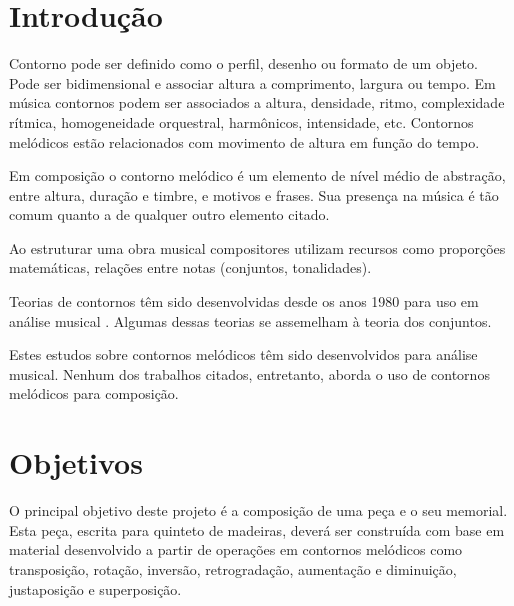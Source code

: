 \documentclass{article}
\begin{document}

\section{Introdução}
\label{sec:introducao}

Contorno pode ser definido como o perfil, desenho ou formato de um
objeto. Pode ser bidimensional e associar altura a comprimento,
largura ou tempo. Em música contornos podem ser associados a altura,
densidade, ritmo, complexidade rítmica, homogeneidade orquestral,
harmônicos, intensidade, etc. Contornos melódicos estão relacionados
com movimento de altura em função do tempo.


Em composição o contorno melódico é um elemento de nível médio de
abstração, entre altura, duração e timbre, e motivos e frases. Sua
presença na música é tão comum quanto a de qualquer outro elemento
citado.


Ao estruturar uma obra musical compositores utilizam recursos como
proporções matemáticas, relações entre notas (conjuntos, tonalidades).


Teorias de contornos têm sido desenvolvidas desde os anos 1980 para
uso em análise musical
\cite{friedmann85:_method_discus_contour,friedmann1987rmc,marvin87:_relat_music_contour,polansky92:_possib_impos_melod,quinn97:_fuzzy_exten_theor_contour}. Algumas
dessas teorias se assemelham à teoria dos conjuntos.


Estes estudos sobre contornos melódicos têm sido desenvolvidos para
análise musical. Nenhum dos trabalhos citados, entretanto, aborda o
uso de contornos melódicos para composição.

\section{Objetivos}
\label{sec:objetivos}

O principal objetivo deste projeto é  a composição de uma peça e o seu
memorial.  Esta peça, escrita  para quinteto  de madeiras,  deverá ser
construída com base em material  desenvolvido a partir de operações em
contornos    melódicos   como    transposição,    rotação,   inversão,
retrogradação, aumentação e diminuição, justaposição e superposição.
\end{document}
